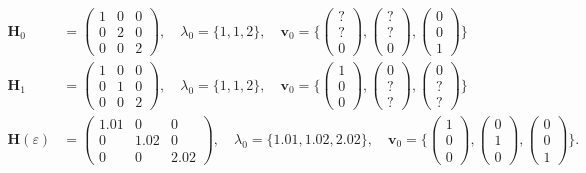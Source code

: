 \begin{align}
    \bm H_0 &=
    \begin{pmatrix}
        1 & 0 & 0\\
        0 & 2 & 0\\
        0 & 0 & 2
    \end{pmatrix},
    \quad
    \lambda_0 = \{1, 1, 2\},
    \quad
    \bm v_0 = \{
    \begin{pmatrix}
        ?\\
        ?\\
        0
    \end{pmatrix},
    \begin{pmatrix}
        ?\\
        ?\\
        0
    \end{pmatrix},
    \begin{pmatrix}
        0\\
        0\\
        1
    \end{pmatrix}
    \}
    \\
    \bm H_1 &=
    \begin{pmatrix}
        1 & 0 & 0\\
        0 & 1 & 0\\
        0 & 0 & 2
    \end{pmatrix},
    \quad
    \lambda_0 = \{1, 1, 2\},
    \quad
    \bm v_0 = \{
    \begin{pmatrix}
        1\\
        0\\
        0
    \end{pmatrix},
    \begin{pmatrix}
        0\\
        ?\\
        ?
    \end{pmatrix},
    \begin{pmatrix}
        0\\
        ?\\
        ?
    \end{pmatrix}
    \}
    \\
    \bm H(\varepsilon) &=
    \begin{pmatrix}
        1.01 & 0 & 0\\
        0 & 1.02 & 0\\
        0 & 0 & 2.02
    \end{pmatrix},
    \quad
    \lambda_0 = \{1.01, 1.02, 2.02\},
    \quad
    \bm v_0 = \{
    \begin{pmatrix}
        1\\
        0\\
        0
    \end{pmatrix},
    \begin{pmatrix}
        0\\
        1\\
        0
    \end{pmatrix},
    \begin{pmatrix}
        0\\
        0\\
        1
    \end{pmatrix}
    \}.
\end{align} \label{ew:eq:entartung_bsp}
